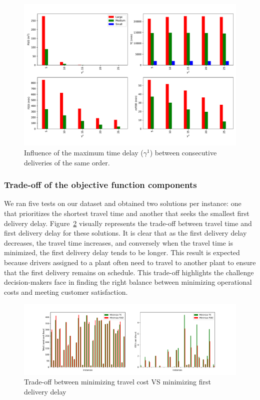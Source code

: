 \documentclass{article}
\begin{document}
\begin{figure}[!h]
    \centering
    \includegraphics[width=1\textwidth]{gamma1.pdf}
    \small
    \caption{Influence of the maximum time delay ($\gamma^1$) between consecutive deliveries of the same order. }
    \label{fig:gamma1_influence}
\end{figure}

\subsubsection{Trade-off of the objective function components}

We ran five tests on our dataset and obtained two solutions per instance: one that prioritizes the shortest travel time and another that seeks the smallest first delivery delay. Figure~\ref*{fig:trade_off} visually represents the trade-off between travel time and first delivery delay for these solutions. It is clear that as the first delivery delay decreases, the travel time increases, and conversely when the travel time is minimized, the first delivery delay tends to be longer. This result is expected because drivers assigned to a plant often need to travel to another plant to ensure that the first delivery remains on schedule. This trade-off highlights the challenge decision-makers face in finding the right balance between minimizing operational costs and meeting customer satisfaction.

\begin{figure}[!h]
    \centering
    \includegraphics[width=1\textwidth]{Trav_FDD.pdf}
    \small
    \caption{Trade-off between minimizing travel cost VS minimizing first delivery delay }
    \label{fig:trade_off}
\end{figure}
\end{document}
